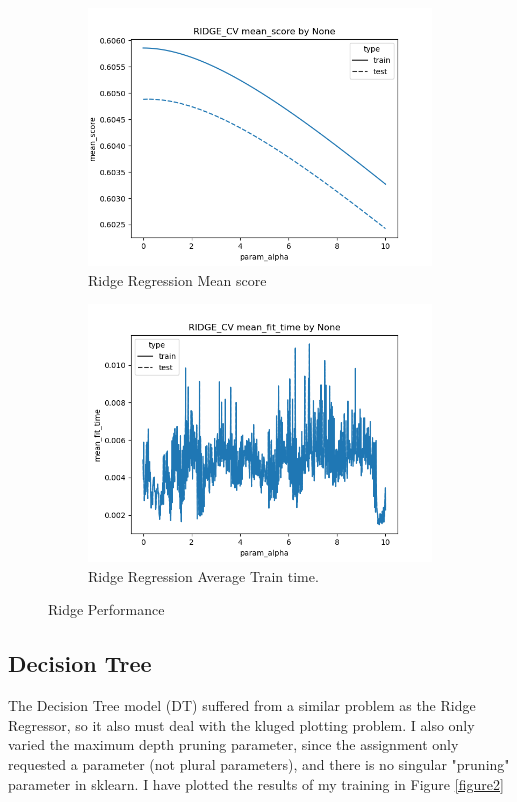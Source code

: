 \documentclass[12pt]{article}
\begin{document}
\begin{figure}
  \begin{subfigure}{.5\textwidth}
    \includegraphics[width=.95\textwidth]{../results/Ridge_cv/None_mean_score_param_alpha.png}
    \caption{Ridge Regression Mean score}
    \end{subfigure}%
  \begin{subfigure}{.5\textwidth}
    \includegraphics[width=.95\textwidth]{../results/Ridge_cv/None_mean_fit_time_param_alpha.png}
    \caption{Ridge Regression Average Train time.}
  \end{subfigure}
  \caption{Ridge Performance}
  \label{figure1}
\end{figure}

\subsection{Decision Tree}
The Decision Tree model (DT) suffered from a similar problem as the Ridge Regressor, so it also must deal with the kluged 
plotting problem. I also only varied the maximum depth pruning parameter, since the assignment only requested a parameter 
(not plural parameters), and there is no singular "pruning" parameter in sklearn. I have plotted the results of my training
in Figure \ref{figure2}
\end{document}
